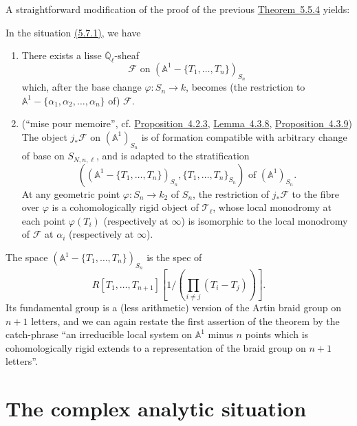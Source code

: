 A straightforward modification of the proof of the previous
\hyperref[thm:5.5.4]{Theorem~5.5.4} yields:

In the situation \hyperref[par:5.7.1]{(5.7.1)}, we have
\begin{enumerate}[label=(\arabic*)]
\item There exists a lisse \(\overline{\mathbb{Q}}_\ell\)-sheaf
\[
  \mathcal{F}\text{ on }(\mathbb{A}^1-\{T_1,\ldots,T_n\})_{S_n}
\]
which, after the base change \(\varphi:S_n\to k\), becomes (the restriction to
\(\mathbb{A}^1-\{\alpha_1,\alpha_2,\ldots,\alpha_n\}\) of) \(\mathcal{F}\).

\item (``mise pour memoire'', cf.
\hyperref[prop:4.2.3]{Proposition~4.2.3},
\hyperref[lem:4.3.8]{Lemma~4.3.8},
\hyperref[prop:4.3.9]{Proposition~4.3.9}) The object \(j_*\mathcal{F}\) on
\((\mathbb{A}^1)_{S_n}\) is of formation compatible with arbitrary change of
base on \(S_{N,n,\ell}\), and is adapted to the stratification
\[
  ((\mathbb{A}^1-\{T_1,\ldots,T_n\})_{S_n},
  \{T_1,\ldots,T_n\}_{S_n})
  \text{ of }(\mathbb{A}^1)_{S_n}.
\]
At any geometric point \(\varphi:S_n\to k_2\) of \(S_n\), the restriction of
\(j_*\mathcal{F}\) to the fibre over \(\varphi\) is a cohomologically rigid
object of \(\mathcal{T}_\ell\), whose local monodromy at each point
\(\varphi(T_i)\) (respectively at \(\infty\)) is isomorphic to the local
monodromy of \(\mathcal{F}\) at \(\alpha_i\) (respectively at \(\infty\)).
\end{enumerate}

The space \((\mathbb{A}^1-\{T_1,\ldots,T_n\})_{S_n}\) is the spec of
\[
  R[T_1,\ldots,T_{n+1}][1/(\prod_{i\neq j}(T_i-T_j))].
\]
Its fundamental group is a (less arithmetic) version of the Artin braid group
on \(n+1\) letters, and we can again restate the first assertion of the
theorem by the catch-phrase ``an irreducible local system on \(\mathbb{A}^1\)
minus \(n\) points which is cohomologically rigid extends to a representation
of the braid group on \(n+1\) letters''.

\section{The complex analytic situation}\label{sec:5.8}

